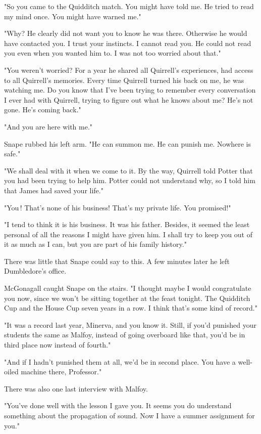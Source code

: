 "So you came to the Quidditch match. You might have told me. He tried to read my mind once. You might have warned me."

"Why? He clearly did not want you to know he was there. Otherwise he would have contacted you. I trust your instincts. I cannot read you. He could not read you even when you wanted him to. I was not too worried about that."

"You weren't worried? For a year he shared all Quirrell's experiences, had access to all Quirrell's memories. Every time Quirrell turned his back on me, he was watching me. Do you know that I've been trying to remember every conversation I ever had with Quirrell, trying to figure out what he knows about me? He's not gone. He's coming back."

"And you are here with me."

Snape rubbed his left arm. "He can summon me. He can punish me. Nowhere is safe."

"We shall deal with it when we come to it. By the way, Quirrell told Potter that you had been trying to help him. Potter could not understand why, so I told him that James had saved your life."

"You{\el}\,! That's none of his business! That's my private life. You promised!"

"I tend to think it is his business. It was his father. Besides, it seemed the least personal of all the reasons I might have given him. I shall try to keep you out of it as much as I can, but you are part of his family history."

There was little that Snape could say to this. A few minutes later he left Dumbledore's office.

McGonagall caught Snape on the stairs. "I thought maybe I would congratulate you now, since we won't be sitting together at the feast tonight. The Quidditch Cup and the House Cup seven years in a row. I think that's some kind of record."

"It was a record last year, Minerva, and you know it. Still, if you'd punished your students the same as Malfoy, instead of going overboard like that, you'd be in third place now instead of fourth."

"And if I hadn't punished them at all, we'd be in second place. You have a well-oiled machine there, Professor."

There was also one last interview with Malfoy.

"You've done well with the lesson I gave you. It seems you do understand something about the propagation of sound. Now I have a summer assignment for you."

